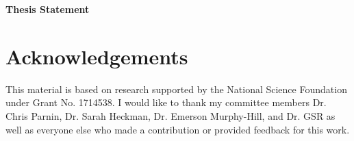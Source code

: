 \documentclass[runningheads]{llncs}
\begin{document}

\noindent
\textbf{\large Thesis Statement} \\












\section{Acknowledgements}

This material is based on research supported by the National Science Foundation under Grant No. 1714538. I would like to thank my committee members Dr. Chris Parnin, Dr. Sarah Heckman, Dr. Emerson Murphy-Hill, and Dr. GSR as well as everyone else who made a contribution or provided feedback for this work.



%
%
%
% 
% 
%


\end{document}
